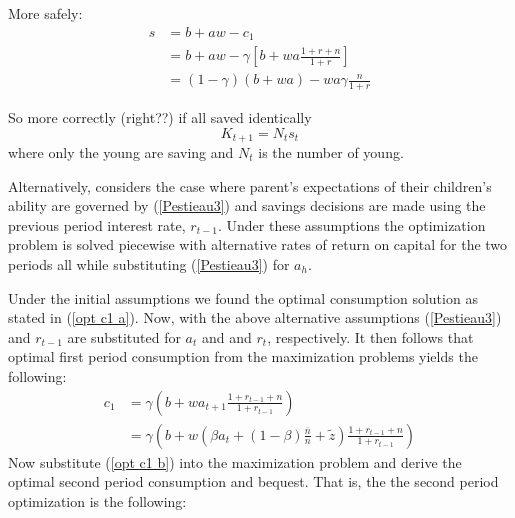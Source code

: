 \documentclass{article}
\begin{document}
More safely:
\begin{equation}
\begin{split}
s
&= b + aw - c_{1}
\\
&= b + aw - \gamma[b + wa \frac{1+r+n}{1+r}]
\\
&= (1-\gamma)(b+wa) - wa \gamma \frac{n}{1+r}
\end{split}
\end{equation}

So more correctly (right??) if all saved identically %
\begin{equation}
K_{t+1} = N_{t} s_{t}
\end{equation}
where only the young are saving and $N_{t}$ is the number of young.\newline


Alternatively, \citet{pestieau-1984-oep} considers the case where parent's expectations of their children's ability are governed by (\ref{Pestieau3}) and savings decisions are made using the previous period interest rate, $r_{t-1}$.  Under these assumptions the optimization problem is solved piecewise with alternative rates of return on capital for the two periods all while substituting (\ref{Pestieau3}) for $a_h$.

Under the initial assumptions we found the optimal consumption solution as stated in (\ref{opt c1 a}).  Now, with the above alternative assumptions (\ref{Pestieau3}) and $r_{t-1}$ are substituted for $a_t$ and and $r_{t}$, respectively.  It then follows that optimal first period consumption from the maximization problems yields the following:
\begin{equation}\label{opt c1 b}
\begin{split}
c_1 
&= \gamma(b+w a_{t+1} \frac{1+r_{t-1}+n}{1+r_{t-1}} )
\\
&= \gamma(b+w (\beta a_t +(1-\beta)\frac{\overline{n}}{n} + \widetilde{z}) \frac{1+r_{t-1}+n}{1+r_{t-1}}  )
\end{split}
\end{equation}
Now substitute (\ref{opt c1 b}) into the maximization problem and derive the optimal second period consumption and bequest.  That is, the the second period optimization is the following:
\end{document}
